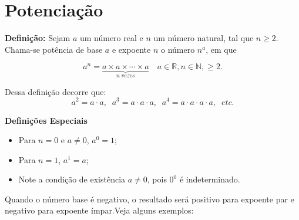 	\section{Potenciação}

    \noindent
	\textbf{Definição:} Sejam $a$ um número real e $n$ um número natural, tal que $ n \geq 2 $. Chama-se potência de base $a$ e expoente $n$ o número $n^a$, em que 
 
	\begin{tcolorbox}[colback=white,colframe=minha_cor,coltitle=black,title=Definição] 
        \[
        a^n = \underbrace{a \times a \times \cdots \times
			a}_{n \; vezes} \quad a \in\mathbb{R}, n \in\mathbb{N}, \geq 2.
        \]
        \end{tcolorbox}
	
	Dessa definição decorre que:
	\begin{equation}
		a^2 = a \cdot a, \;\; a^3 = a \cdot a \cdot a, \;\; a^4 = a \cdot a \cdot a \cdot a, \;\; etc.
		\nonumber
	\end{equation}

    \noindent
	\textbf{Definições Especiais}
	\begin{itemize}
		\item Para $n = 0$ e $a \neq 0$, $a^0 = 1$;
		\item Para $n = 1$, $a^1 = a$;
        \item Note a condição de existência $a \neq 0$, pois $0^0$ é indeterminado.
	\end{itemize}

        \begin{texample}
        \centering
        \end{texample}
 
	Quando o número base é negativo, o resultado será positivo para expoente par e negativo para expoente ímpar.Veja alguns exemplos:

        \begin{texample}
        \centering
        \end{texample}
	
